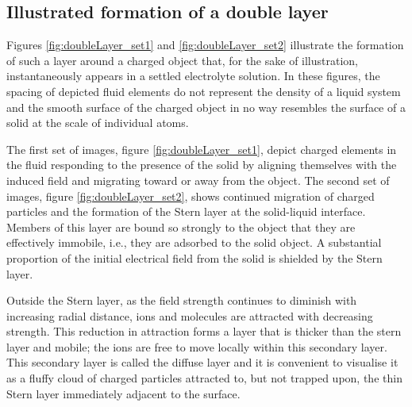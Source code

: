 \subsection{Illustrated formation of a double layer}
    Figures \ref{fig:doubleLayer_set1} and \ref{fig:doubleLayer_set2} illustrate the formation of such a layer around a charged object that, for the sake of illustration, instantaneously appears in a settled electrolyte solution. In these figures, the spacing of depicted fluid elements do not represent the density of a liquid system and the smooth surface of the charged object in no way resembles the surface of a solid at the scale of individual atoms.

    The first set of images, figure \ref{fig:doubleLayer_set1}, depict charged elements in the fluid responding to the presence of the solid by aligning themselves with the induced field and migrating toward or away from the object. The second set of images, figure \ref{fig:doubleLayer_set2}, shows continued migration of charged particles and the formation of the Stern layer at the solid-liquid interface. Members of this layer are bound so strongly to the object that they are effectively immobile, i.e., they are adsorbed to the solid object. A substantial proportion of the initial electrical field from the solid is shielded by the Stern layer.

    Outside the Stern layer, as the field strength continues to diminish with increasing radial distance, ions and molecules are attracted with decreasing strength. This reduction in attraction forms a layer that is thicker than the stern layer and mobile; the ions are free to move locally within this secondary layer. This secondary layer is called the diffuse layer and it is convenient to visualise it as a fluffy cloud of charged particles attracted to, but not trapped upon, the thin Stern layer immediately adjacent to the surface.



